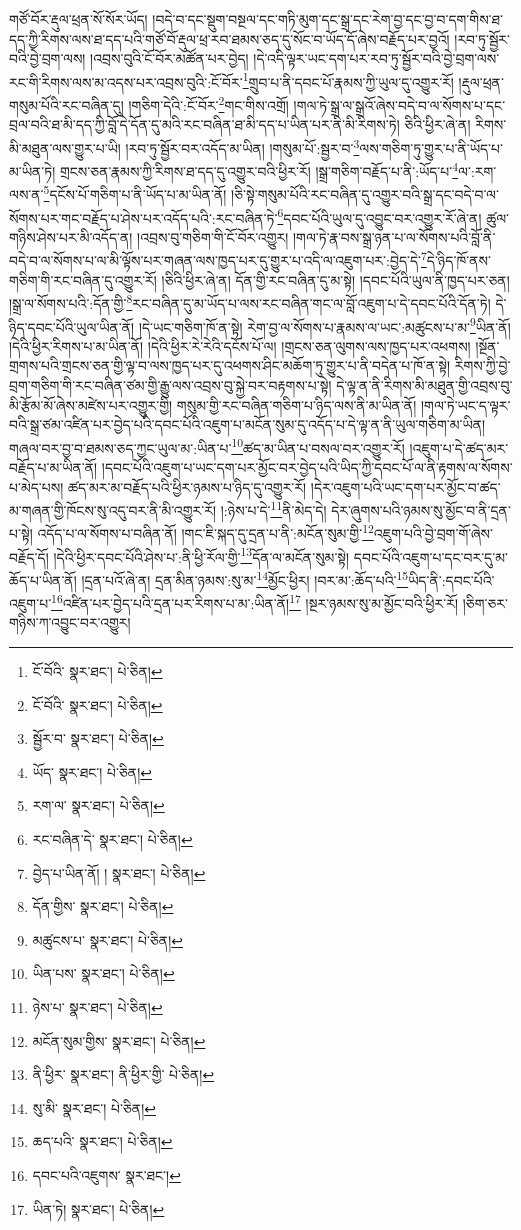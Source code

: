 གཙོ་བོར་རྡུལ་ཕྲན་སོ་སོར་ཡོད། །བདེ་བ་དང་སྡུག་བསྔལ་དང་གཏི་མུག་དང་སྒྲ་དང་རེག་བྱ་དང་བྱ་བ་དག་གིས་ཐ་དད་ཀྱི་རིགས་ལས་ཐ་དད་པའི་གཙོ་བོ་རྡུལ་ཕྲ་རབ་ཐམས་ཅད་དུ་སོང་བ་ཡོད་དོ་ཞེས་བརྗོད་པར་བྱའོ། །རབ་ཏུ་སྦྱོར་བའི་བྱེ་བྲག་ལས། །འབྲས་བུའི་ངོ་བོར་མཚོན་པར་བྱེད། །དེ་འདི་ལྟར་ཡང་དག་པར་རབ་ཏུ་སྦྱོར་བའི་བྱེ་བྲག་ལས་རང་གི་རིགས་ལས་མ་འདས་པར་འབྲས་བུའི་:ངོ་བོར་\footnote{ངོ་བོའི་  སྣར་ཐང་།  པེ་ཅིན། }གྲུབ་པ་ནི་དབང་པོ་རྣམས་ཀྱི་ཡུལ་དུ་འགྱུར་རོ། །རྡུལ་ཕྲན་གསུམ་པོའི་རང་བཞིན་དུ། །གཅིག་དེའི་:ངོ་བོར་\footnote{ངོ་བོའི་  སྣར་ཐང་།  པེ་ཅིན། }གང་གིས་འགྲོ། །གལ་ཏེ་སྒྲ་ལ་སྒྲའོ་ཞེས་བདེ་བ་ལ་སོགས་པ་དང་བྲལ་བའི་ཐ་མི་དད་ཀྱི་བློ་དེ་དོན་དུ་མའི་རང་བཞིན་ཐ་མི་དད་པ་ཡིན་པར་ནི་མི་རིགས་ཏེ། ཅིའི་ཕྱིར་ཞེ་ན། རིགས་མི་མཐུན་ལས་གྱུར་པ་ཡི། །རབ་ཏུ་སྦྱོར་བར་འདོད་མ་ཡིན། །གསུམ་པོ་:སྦྱར་བ་\footnote{སྦྱོར་བ་  སྣར་ཐང་།  པེ་ཅིན། }ལས་གཅིག་ཏུ་གྱུར་པ་ནི་ཡོད་པ་མ་ཡིན་ཏེ། གྲངས་ཅན་རྣམས་ཀྱི་རིགས་ཐ་དད་དུ་འགྱུར་བའི་ཕྱིར་རོ། །སྒྲ་གཅིག་བརྗོད་པ་ནི་:ཡོད་པ་\footnote{ཡོད་  སྣར་ཐང་།  པེ་ཅིན། }ལ་:རག་ལས་ན་\footnote{རག་ལ་  སྣར་ཐང་།  པེ་ཅིན། }དངོས་པོ་གཅིག་པ་ནི་ཡོད་པ་མ་ཡིན་ནོ། །ཅི་སྟེ་གསུམ་པོའི་རང་བཞིན་དུ་འགྱུར་བའི་སྒྲ་དང་བདེ་བ་ལ་སོགས་པར་གང་བརྗོད་པ་ཤེས་པར་འདོད་པའི་:རང་བཞིན་ཏེ་\footnote{རང་བཞིན་དེ་  སྣར་ཐང་།  པེ་ཅིན། }དབང་པོའི་ཡུལ་དུ་འབྱུང་བར་འགྱུར་རོ་ཞེ་ན། ཚུལ་གཉིས་ཤེས་པར་མི་འདོད་ན། །འབྲས་བུ་གཅིག་གི་ངོ་བོར་འགྱུར། །གལ་ཏེ་རྣ་བས་སྒྲ་ཉན་པ་ལ་སོགས་པའི་བློ་ནི་བདེ་བ་ལ་སོགས་པ་ལ་མི་ལྟོས་པར་གཞན་ལས་ཁྱད་པར་དུ་གྱུར་པ་འདི་ལ་འཇུག་པར་:བྱེད་དེ་\footnote{བྱེད་པ་ཡིན་ནོ། །  སྣར་ཐང་།  པེ་ཅིན། }དེ་ཉིད་ཁོ་ནས་གཅིག་གི་རང་བཞིན་དུ་འགྱུར་རོ། །ཅིའི་ཕྱིར་ཞེ་ན། དོན་གྱི་རང་བཞིན་དུ་མ་སྟེ། །དབང་པོའི་ཡུལ་ནི་ཁྱད་པར་ཅན། །སྒྲ་ལ་སོགས་པའི་:དོན་གྱི་\footnote{དོན་གྱིས་  སྣར་ཐང་།  པེ་ཅིན། }རང་བཞིན་དུ་མ་ཡོད་པ་ལས་རང་བཞིན་གང་ལ་བློ་འཇུག་པ་དེ་དབང་པོའི་དོན་ཏེ། དེ་ཉིད་དབང་པོའི་ཡུལ་ཡིན་ནོ། །དེ་ཡང་གཅིག་ཁོ་ན་སྟེ། རེག་བྱ་ལ་སོགས་པ་རྣམས་ལ་ཡང་:མཚུངས་པ་མ་\footnote{མཚུངས་པ་  སྣར་ཐང་།  པེ་ཅིན། }ཡིན་ནོ། །དེའི་ཕྱིར་རིགས་པ་མ་ཡིན་ནོ། །དེའི་ཕྱིར་རེ་རེའི་དངོས་པོ་ལ། །གྲངས་ཅན་ལུགས་ལས་ཁྱད་པར་འཕགས། །སྔོན་གྲགས་པའི་གྲངས་ཅན་གྱི་ལྟ་བ་ལས་ཁྱད་པར་དུ་འཕགས་ཤིང་མཆོག་ཏུ་གྱུར་པ་ནི་བདེན་པ་ཁོ་ན་སྟེ། རིགས་ཀྱི་བྱེ་བྲག་གཅིག་གི་རང་བཞིན་ཙམ་གྱི་རྒྱུ་ལས་འབྲས་བུ་སྐྱེ་བར་བརྟགས་པ་སྟེ། དེ་ལྟ་ན་ནི་རིགས་མི་མཐུན་གྱི་འབྲས་བུ་མི་རྩོམ་མོ་ཞེས་མཛེས་པར་འགྱུར་གྱི། གསུམ་གྱི་རང་བཞིན་གཅིག་པ་ཉིད་ལས་ནི་མ་ཡིན་ནོ། །གལ་ཏེ་ཡང་ད་ལྟར་བའི་སྒྲ་ཙམ་འཛིན་པར་བྱེད་པའི་དབང་པོའི་འཇུག་པ་མངོན་སུམ་དུ་འདོད་པ་དེ་ལྟ་ན་ནི་ཡུལ་གཅིག་མ་ཡིན། གཞལ་བར་བྱ་བ་ཐམས་ཅད་ཀྱང་ཡུལ་མ་:ཡིན་པ་\footnote{ཡིན་པས་  སྣར་ཐང་།  པེ་ཅིན། }ཚད་མ་ཡིན་པ་བསལ་བར་འགྱུར་རོ། །འཇུག་པ་དེ་ཚད་མར་བརྗོད་པ་མ་ཡིན་ནོ། །དབང་པོའི་འཇུག་པ་ཡང་དག་པར་མྱོང་བར་བྱེད་པའི་ཡིད་ཀྱི་དབང་པོ་ལ་ནི་རྟགས་ལ་སོགས་པ་མེད་པས། ཚད་མར་མ་བརྗོད་པའི་ཕྱིར་ཉམས་པ་ཉིད་དུ་འགྱུར་རོ། །དེར་འཇུག་པའི་ཡང་དག་པར་མྱོང་བ་ཚད་མ་གཞན་གྱི་ཁོངས་སུ་འདུ་བར་ནི་མི་འགྱུར་རོ། །:ཉེས་པ་དེ་\footnote{ཉེས་པ་  སྣར་ཐང་།  པེ་ཅིན། }ནི་མེད་དེ། དེར་ཞུགས་པའི་ཉམས་སུ་མྱོང་བ་ནི་དྲན་པ་སྟེ། འདོད་པ་ལ་སོགས་པ་བཞིན་ནོ། །གང་ཇི་སྐད་དུ་དྲན་པ་ནི་:མངོན་སུམ་གྱི་\footnote{མངོན་སུམ་གྱིས་  སྣར་ཐང་།  པེ་ཅིན། }འཇུག་པའི་བྱེ་བྲག་གོ་ཞེས་བརྗོད་དོ། །དེའི་ཕྱིར་དབང་པོའི་ཤེས་པ་:ནི་ཕྱི་རོལ་གྱི་\footnote{ནི་ཕྱིར་  སྣར་ཐང་། ནི་ཕྱིར་གྱི་  པེ་ཅིན། }དོན་ལ་མངོན་སུམ་སྟེ། དབང་པོའི་འཇུག་པ་དང་བར་དུ་མ་ཆོད་པ་ཡིན་ནོ། །དྲན་པའོ་ཞེ་ན། དྲན་མིན་ཉམས་:སུ་མ་\footnote{སུ་མི་  སྣར་ཐང་།  པེ་ཅིན། }མྱོང་ཕྱིར། །བར་མ་:ཆོད་པའི་\footnote{ཆད་པའི་  སྣར་ཐང་།  པེ་ཅིན། }ཡིད་ནི་:དབང་པོའི་འཇུག་པ་\footnote{དབང་པའི་འཇུགས་  སྣར་ཐང་། }འཛིན་པར་བྱེད་པའི་དྲན་པར་རིགས་པ་མ་:ཡིན་ནོ།\footnote{ཡིན་ཏེ།  སྣར་ཐང་།  པེ་ཅིན། } །སྔར་ཉམས་སུ་མ་མྱོང་བའི་ཕྱིར་རོ། །ཅིག་ཅར་གཉིས་ཀ་འབྱུང་བར་འགྱུར། 